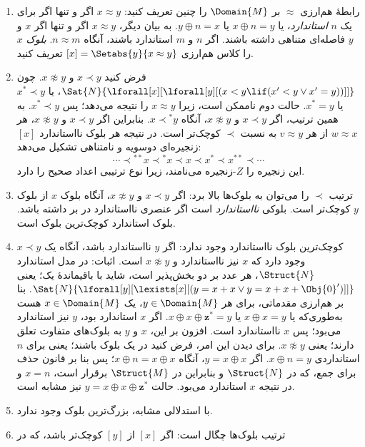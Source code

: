 \documentclass[../../../include/open-logic-section]{subfiles}
\begin{document}
\begin{enumerate}
  یکی نااستاندارد باشد هر دو نااستانداردند.
\item رابطهٔ هم‌ارزی $\approx$ بر $\Domain{M}$ را چنین تعریف کنید:
  $x \approx y$ اگر و تنها اگر برای یک $n$ \emph{استاندارد}، یا
  $x \oplus n = y$ یا $y \oplus n =x$. به بیان دیگر، $x \approx y$
  اگر و تنها اگر $x$ و $y$ فاصله‌ای متناهی داشته باشند. اگر $n$ و
  $m$ استاندارد باشند، آنگاه $n \approx m$. \emph{بلوک} $x$ را کلاس
  هم‌ارزی $[x] = \Setabs{y}{x \approx y}$ تعریف کنید.
\item فرض کنید $x \prec y$ و $x \not\approx y$. چون
  $\Sat{N}{\lforall[x][\lforall[y][(x < y \lif (x' < y \lor x' =
      y))]]}$، یا $x^* \prec y$ یا $x^* = y$. حالت دوم ناممکن است،
  زیرا $x \approx y$ را نتیجه می‌دهد؛ پس $x^* \prec y$. به همین
  ترتیب، اگر $x \prec y$ و $x \not\approx y$، آنگاه
  $x \prec {^*y}$. بنابراین اگر $x \prec y$ و $x \not\approx y$،
  هر $w \approx x$ از هر $v \approx y$ به نسبت $\prec$ کوچک‌تر است.
  در نتیجه هر بلوک نااستاندارد $[x]$ زنجیره‌ای دوسویه و نامتناهی
  تشکیل می‌دهد:
  \[
  \cdots \prec  {^{**}x} \prec {^*}x \prec x \prec x^* \prec x^{**}
  \prec \cdots
  \]
  این زنجیره را $Z$-زنجیره می‌نامند، زیرا نوع ترتیبی اعداد صحیح را دارد.
\item ترتیب $\prec$ را می‌توان به بلوک‌ها بالا برد: اگر $x \prec y$ و
  $x \not\approx y$، آنگاه بلوک $x$ از بلوک $y$ کوچک‌تر است. بلوکی
  \emph{نااستاندارد} است اگر عنصری نااستاندارد در بر داشته باشد. بلوک
  استاندارد کوچک‌ترین بلوک است.
\item کوچک‌ترین بلوک نااستاندارد وجود ندارد: اگر $y$ نااستاندارد باشد،
  آنگاه یک $x \prec y$ وجود دارد که $x$ نیز نااستاندارد و
  $x \not\approx y$ است. اثبات: در مدل استاندارد $\Struct{N}$، هر عدد
  بر دو بخش‌پذیر است، شاید با باقیماندهٔ یک؛ یعنی
  $\Sat{N}{\lforall[y][\lexists[x][(y = x + x \lor y = x + x +
        \Obj{0}')]]}$. بنا بر هم‌ارزی مقدماتی، برای هر
  $y \in \Domain{M}$، یک $x \in \Domain{M}$ هست به‌طوری‌که یا
  $x \oplus x = y$ یا
  $x \oplus x \oplus \mathbf{z}^*= y$. اگر $x$ استاندارد بود، $y$ نیز
  استاندارد می‌بود؛ پس $x$ نااستاندارد است. افزون بر این، $x$ و $y$
  به بلوک‌های متفاوت تعلق دارند؛ یعنی $x \not\approx y$. برای دیدن
  این امر، فرض کنید در یک بلوک باشند؛ یعنی برای $n$ استانداردی
  $x \oplus n = y$. اگر $y = x \oplus x$، آنگاه
  $x \oplus n = x \oplus x$؛ پس بنا بر قانون حذف برای جمع، که در
  $\Struct{N}$ و بنابراین در $\Struct{M}$ برقرار است، $x = n$ و در
  نتیجه $x$ استاندارد می‌بود. حالت
  $y = x \oplus x \oplus \mathbf{z}^*$ نیز مشابه است.
\item با استدلالی مشابه، بزرگ‌ترین بلوک وجود ندارد.
\item ترتیب بلوک‌ها چگال است: اگر $[x]$ از $[y]$ کوچک‌تر باشد، که در

\end{enumerate}
\end{document}
